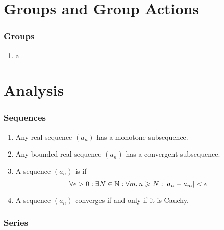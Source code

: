 \documentclass{styles/note}
\begin{document}
\newpage
\part{Groups and Group Actions}

\section{Groups}
  
  \begin{enumerate}[label=(\alph*)]
    \item a
  \end{enumerate}





\part{Analysis}

\section{Sequences}
  
  \begin{enumerate}[label=(\alph*)]
    \item {}
      Any real sequence $(a_n)$ has a monotone subsequence.
    
    \item {}
      Any bounded real sequence $(a_n)$ has a convergent subsequence.
    
    \item A sequence $(a_n)$ is  if
      \[ \forall \epsilon > 0 : \exists N \in \mathbb{N} : \forall m,n \geqslant N : \abs{a_n - a_m} < \epsilon \]
    
    \item A sequence $(a_n)$ converges if and only if it is Cauchy.
  \end{enumerate}


\newpage
\section{Series}
  
\end{document}
